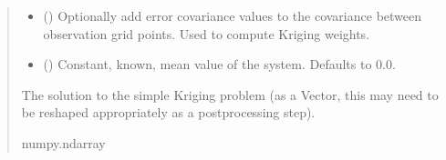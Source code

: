 \documentclass[letterpaper,10pt,english]{sphinxmanual}
\begin{document}
\begin{fulllineitems}
\begin{fulllineitems}
\begin{quote}
\begin{description}
\begin{itemize}
\item {}
\sphinxAtStartPar
{} (\sphinxstyleliteralemphasis{\sphinxupquote{ | }}) \textendash{} Optionally add error covariance values to the covariance between
observation grid points. Used to compute Kriging weights.

\item {}
\sphinxAtStartPar
{} (\sphinxstyleliteralemphasis{\sphinxupquote{ | }}) \textendash{} Constant, known, mean value of the system. Defaults to 0.0.

\end{itemize}

\sphinxAtStartPar
The solution to the simple Kriging problem (as a Vector, this may
need to be re\sphinxhyphen{}shaped appropriately as a post\sphinxhyphen{}processing step).

\sphinxAtStartPar
numpy.ndarray

\end{description}\end{quote}

\end{fulllineitems}


\end{fulllineitems}

\end{document}
